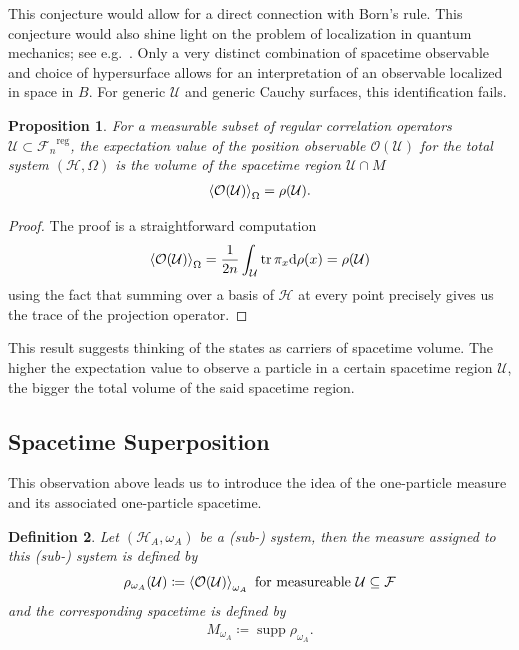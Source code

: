 \documentclass[reqno,11pt]{amsart}
\DeclareMathOperator{\supp}{supp}
\newcommand{\defeq}{\coloneqq}
\renewcommand{\H}{\mathcal{H}}
\newcommand{\F}{{\mathcal{F}}}
\newtheorem{definition}{Definition}[section]
\newtheorem{proposition}[definition]{Proposition}
\numberwithin{equation}{section}
\begin{document}
This conjecture would allow for a direct connection with Born's rule.
This conjecture would also shine light on the problem of localization in quantum mechanics; see e.g.~\cite{hegerfeldt1974remark,skagerstam,finster2023incompatibility, castrigiano2017dirac,perez1977localization, beck2021local}.
Only a very distinct combination of spacetime observable and choice of hypersurface allows for an interpretation of an
observable localized in space in $B$.
For generic $\mathcal{U}$ and generic Cauchy surfaces, this identification fails.
\begin{proposition}
    For a measurable subset of regular correlation operators $\mathcal{U} \subset{\F_n}^{\text{reg}}$, the expectation value of
    the position observable $\mathcal{O}(\mathcal{U})$ for the total system $(\H, \Omega)$ is the volume of the spacetime region $\mathcal{U} \cap M$
    \begin{align}
        \expval{\mathcal{O}(\mathcal{U})}_{\Omega} = \rho(\mathcal{U}).
    \end{align}
\end{proposition}
\begin{proof}
    The proof is a straightforward computation
    \begin{align*}
        \expval{\mathcal{O}(\mathcal{U})}_{\Omega} = \frac{1}{2n} \int_{\mathcal{U}} \tr \pi_x \dd \rho(x) = \rho(\mathcal{U})
    \end{align*}
    using the fact that summing over a basis of $\H$ at every point precisely gives us the trace of the projection operator.
\end{proof}
This result suggests thinking of the states as carriers of spacetime volume.
The higher the expectation value to observe a particle in a certain spacetime region $\mathcal{U}$, the bigger the total
volume of the said spacetime region.




% 
\subsection{Spacetime Superposition}\label{subsec:spacetime-superposition}

This observation above leads us to introduce the idea of the one-particle measure and its associated one-particle spacetime.

\begin{definition}\label{def:subsystem}
    Let $(\H_A, \omega_A)$ be a (sub-) system, then the measure assigned to this (sub-) system is defined by
    \begin{align}
        \rho_{\omega_A} (\mathcal{U}) \defeq \expval{\mathcal{O}(\mathcal{U})}_{\omega_A} \text{ for measureable } \mathcal{U} \subseteq \F
    \end{align}
    and the corresponding spacetime is defined by
    \begin{align}
        M_{\omega_A} \defeq \supp \rho_{\omega_A}.
    \end{align}
\end{definition}
\end{document}
